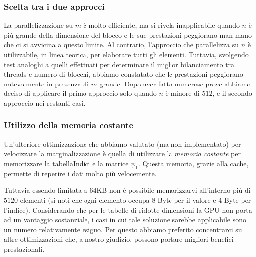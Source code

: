 \documentclass[a4paper]{article}   %
\begin{document}
\subsubsection{Scelta tra i due approcci}
La parallelizzazione su $m$ è molto efficiente, ma si rivela inapplicabile quando $n$ è più grande della dimensione del blocco e le sue prestazioni peggiorano man mano che ci si avvicina a questo limite.
Al contrario, l’approccio che parallelizza su $n$ è utilizzabile, in linea teorica, per elaborare tutti gli elementi. Tuttavia, svolgendo test analoghi a quelli effettuati per determinare il miglior bilanciamento tra threads e numero di blocchi, abbiamo constatato che le prestazioni peggiorano notevolmente in presenza di $m$ grande. 
Dopo aver fatto numerose prove abbiamo deciso di applicare il primo approccio solo quando $n$ è minore di $512$, e il secondo approccio nei restanti casi.

\subsubsection{Utilizzo della memoria costante}
Un’ulteriore ottimizzazione che abbiamo valutato (ma non implementato) per velocizzare la marginalizzazione è quella di utilizzare la \emph{memoria costante} per memorizzare la tabellaIndici e la matrice $\psi_1$. Questa memoria, grazie alla cache, permette di reperire i dati molto più velocemente. 

Tuttavia essendo limitata a $64$KB non è possibile memorizzarvi all’interno più di $5120$ elementi (si noti che ogni elemento occupa $8$ Byte per il valore e $4$ Byte per l’indice). Considerando che per le tabelle di ridotte dimensioni la GPU non porta ad un vantaggio sostanziale, i casi in cui tale soluzione sarebbe applicabile sono un numero relativamente esiguo. Per questo abbiamo preferito concentrarci su altre ottimizzazioni che, a nostro giudizio, possono portare migliori benefici prestazionali.
\end{document}
